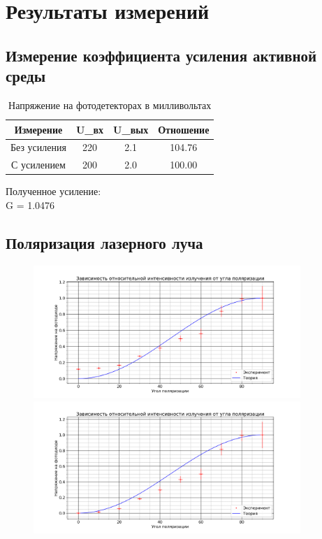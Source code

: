 \section*{Результаты измерений}

\subsection*{Измерение коэффициента усиления активной среды}
	
		\begin{table}[H]
			\caption{Напряжение на фотодетекторах в милливольтах}
			\label{tab:my-table}
			\begin{center}
				\begin{tabular}{|c|c|c|c|}
					\hline
					Измерение & U\_вх & U\_вых & Отношение\\ \hline
					Без усиления & 220   & 2.1 &  104.76	\\ \hline
					С усилением  & 200   & 2.0 &  100.00	\\ \hline
				\end{tabular}
			\end{center}
		\end{table}

\begin{center}
	Полученное усиление:\\
	G = 1.0476
\end{center}

\subsection*{Поляризация лазерного луча}

\begin{figure}[H]
	\centering
	\includegraphics[width=0.9\textwidth]{../Изображения/Поляризация.png}
	\includegraphics[width=0.9\textwidth]{../Изображения/Поляризация уточненная.png}
\end{figure}


